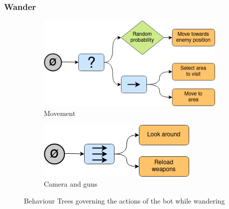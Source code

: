 \subsubsection{Wander}

\begin{figure}[hbtp]
\centering
\begin{subfigure}[c]{0.4\linewidth}
	\centering
	\includegraphics[width=\linewidth]{Images/images/WanderMovement.drawio.png} 
	\caption{Movement}
\end{subfigure}

\begin{subfigure}[c]{0.3\linewidth}
	\centering	
	\includegraphics[width=\linewidth]{Images/images/WanderHead.drawio.png} 
	\caption{Camera and guns}
\end{subfigure}

\caption{Behaviour Trees governing the actions of the bot while wandering}
\label{fig:wander_bt}
\end{figure}

%
%

